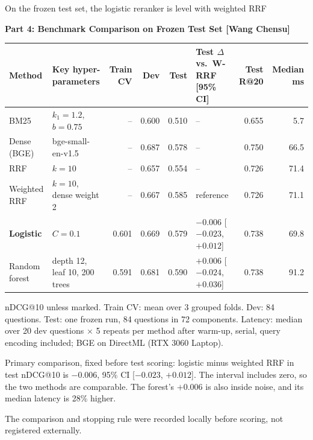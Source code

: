 \documentclass[aspectratio=169,10pt,xcolor=table]{beamer}
\newcommand{\spk}{}
\newcommand{\speakername}{HU Yuyi}
\newcommand{\sect}[1]{{\small\bfseries\color{ink}#1\par}\vspace{2pt}}
\newcommand{\fnote}[1]{{\tiny\color{muted}#1\par}}
\begin{document}
\renewcommand{\speakername}{Wang Chensu (60979223)}
\renewcommand{\spk}{0:55}
\begin{frame}{On the frozen test set, the logistic reranker is level with weighted RRF}
\sect{Part 4: Benchmark Comparison on Frozen Test Set [Wang Chensu]}
\begingroup\scriptsize\setlength{\tabcolsep}{4.5pt}
\begin{tabular}{@{}llrrrlrr@{}}
\toprule
\textbf{Method} & \textbf{Key hyper-parameters} & \textbf{Train CV} & \textbf{Dev} & \textbf{Test}
  & \textbf{Test $\Delta$ vs.\ W-RRF [95\% CI]} & \textbf{Test R@20} & \textbf{Median ms}\\
\midrule
BM25 & $k_1=1.2$, $b=0.75$ & -- & 0.600 & 0.510 & -- & 0.655 & 5.7\\
Dense (BGE) & bge-small-en-v1.5 & -- & 0.687 & 0.578 & -- & 0.750 & 66.5\\
RRF & $k=10$ & -- & 0.657 & 0.554 & -- & 0.726 & 71.4\\
Weighted RRF & $k=10$, dense weight 2 & -- & 0.667 & 0.585 & reference & 0.726 & 71.1\\
\rowcolor{brandsoft}\textbf{Logistic} & $C=0.1$ & 0.601 & 0.669 & 0.579
  & $\mathbf{-0.006}$ [$-0.023$, $+0.012$] & 0.738 & 69.8\\
Random forest & depth 12, leaf 10, 200 trees & 0.591 & 0.681 & 0.590
  & $+0.006$ [$-0.024$, $+0.036$] & 0.738 & 91.2\\
\bottomrule
\end{tabular}\par\endgroup
\vspace{4pt}
\fnote{nDCG@10 unless marked. Train CV: mean over 3 grouped folds. Dev: 84 questions. Test: one frozen run,
  84 questions in 72 components. Latency: median over 20 dev questions $\times$ 5 repeats per method after
  warm-up, serial, query encoding included; BGE on DirectML (RTX 3060 Laptop).}
\vspace{6pt}
\begin{takeaway}Primary comparison, fixed before test scoring: logistic minus weighted RRF in test nDCG@10 is
  $-0.006$, 95\% CI [$-0.023$, $+0.012$]. The interval includes zero, so the two methods are comparable.
  The forest's $+0.006$ is also inside noise, and its median latency is 28\% higher.\end{takeaway}
\vspace{2pt}
\fnote{The comparison and stopping rule were recorded locally before scoring, not registered externally.}
\end{frame}
\end{document}
